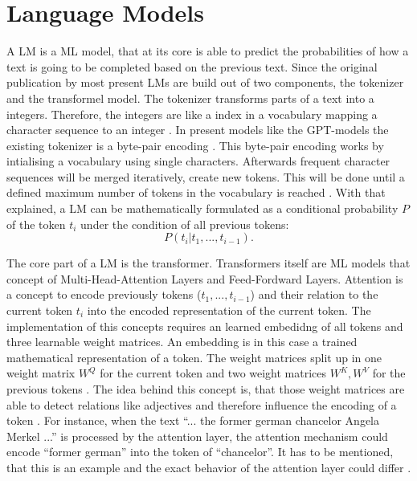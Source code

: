 \documentclass[a4paper,oneside,bibliography=totoc]{scrbook}
\begin{document}
\section{Language Models}
\label{sec:language_models}
A \ac{LM} is a \ac{ML} model, that at its core is able to predict the probabilities of how a text is going to be completed based on the previous text\cite{Radford2019}. Since the original publication by \citet{Vaswani2023} most present \acp{LM} are build out of two components, the tokenizer and the transformel model. The tokenizer transforms parts of a text into a integers. Therefore, the integers are like a index in a vocabulary mapping a character sequence to an integer \cite{Sennrich2016}. In present models like the GPT-models the existing tokenizer is a byte-pair encoding \cite{Radford2019}. This byte-pair encoding works by intialising a vocabulary using single characters. Afterwards frequent character sequences will be merged iteratively, create new tokens. This will be done until a defined maximum number of tokens in the vocabulary is reached \cite{Sennrich2016}. With that explained, a \ac{LM} can be mathematically formulated as a conditional probability $P$ of the token $t_i$ under the condition of all previous tokens:
\begin{equation}
  P(t_i|t_1,...,t_{i-1}).
\end{equation}

The core part of a \ac{LM} is the transformer. Transformers itself are \ac{ML} models that concept of Multi-Head-Attention Layers and Feed-Fordward Layers. Attention is a concept to encode previously tokens ($t_1,...,t_{i-1}$) and their relation to the current token $t_i$ into the encoded representation of the current token. The implementation of this concepts requires an learned embedidng of all tokens and three learnable weight matrices. An embedding is in this case a trained mathematical representation of a token. The weight matrices split up in one weight matrix $W^Q$ for the current token and two weight matrices $W^K, W^V$ for the previous tokens \cite{Vaswani2023}. The idea behind this concept is, that those weight matrices are able to detect relations like adjectives and therefore influence the encoding of a token \cite{Sanderson2024}. For instance, when the text \enquote{... the former german chancelor Angela Merkel ...} is processed by the attention layer, the attention mechanism could encode \enquote{former german} into the token of \enquote{chancelor}. It has to be mentioned, that this is an example and the exact behavior of the attention layer could differ \cite{Sanderson2024}.
\end{document}
